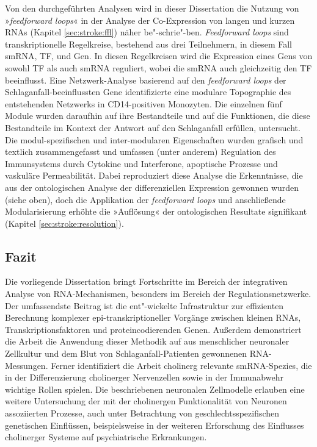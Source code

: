 Von den durchgeführten Analysen wird in dieser Dissertation die Nutzung von »\emph{feedforward loops}« in der Analyse der Co-Expression von langen und kurzen RNAs (Kapitel \ref{sec:stroke:ffl}) näher be"-schrie"-ben. \emph{Feedforward loops} sind transkriptionelle Regelkreise, bestehend aus drei Teilnehmern, in diesem Fall smRNA, TF, und Gen. In diesen Regelkreisen wird die Expression eines Gens von sowohl TF als auch smRNA reguliert, wobei die smRNA auch gleichzeitig den TF beeinflusst. Eine Netzwerk-Analyse basierend auf den \emph{feedforward loops} der Schlaganfall-beeinflussten Gene identifizierte eine modulare Topographie des entstehenden Netzwerks in CD14-positiven Monozyten. Die einzelnen fünf Module wurden daraufhin auf ihre Bestandteile und auf die Funktionen, die diese Bestandteile im Kontext der Antwort auf den Schlaganfall erfüllen, untersucht. Die modul-spezifischen und inter-modularen Eigenschaften wurden grafisch und textlich zusammengefasst und umfassen (unter anderem) Regulation des Immunsystems durch Cytokine und Interferone, apoptische Prozesse und vaskuläre Permeabilität. Dabei reproduziert diese Analyse die Erkenntnisse, die aus der ontologischen Analyse der differenziellen Expression gewonnen wurden (siehe oben), doch die Applikation der \emph{feedforward loops} und anschließende Modularisierung erhöhte die »Auflösung« der ontologischen Resultate signifikant (Kapitel \ref{sec:stroke:resolution}).

\subsection{Fazit}
Die vorliegende Dissertation bringt Fortschritte im Bereich der integrativen Analyse von RNA-Mechanismen, besonders im Bereich der Regulationsnetzwerke. Der umfassendste Beitrag ist die ent"-wickelte Infrastruktur zur effizienten Berechnung komplexer epi-transkriptioneller Vorgänge zwischen kleinen RNAs, Transkriptionsfaktoren und proteincodierenden Genen. Außerdem demonstriert die Arbeit die Anwendung dieser Methodik auf aus menschlicher neuronaler Zellkultur und dem Blut von Schlaganfall-Patienten gewonnenen RNA-Messungen. Ferner identifiziert die Arbeit cholinerg relevante smRNA-Spezies, die in der Differenzierung cholinerger Nervenzellen sowie in der Immunabwehr wichtige Rollen spielen. Die beschriebenen neuronalen Zellmodelle erlauben eine weitere Untersuchung der mit der cholinergen Funktionalität von Neuronen assoziierten Prozesse, auch unter Betrachtung von geschlechtsspezifischen genetischen Einflüssen, beispielsweise in der weiteren Erforschung des Einflusses cholinerger Systeme auf psychiatrische Erkrankungen.

